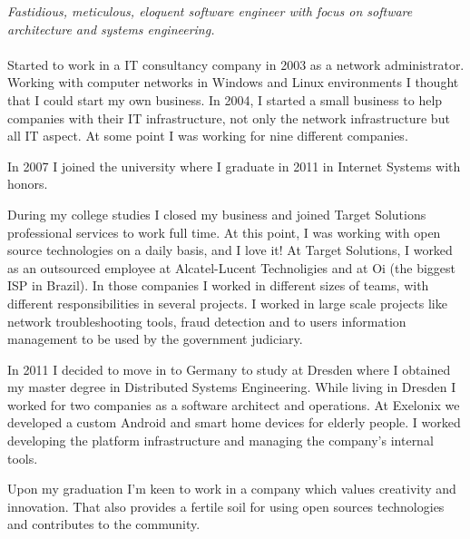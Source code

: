 \documentclass[10pt,a4paper]{article}
\newcommand*\acr[1]{\textscale{.85}{#1}}
\begin{document}
\vspace{-1.3em}  %
\begin{multicols}{2}  %
\noindent \emph{Fastidious, meticulous, eloquent software engineer with focus on software architecture and systems engineering.}
\\
\\
Started to work in a IT consultancy company in 2003 as a network administrator. Working with computer networks in Windows and Linux environments I thought that I could start my own business. In 2004, I started a small business to help companies with their IT infrastructure, not only the network infrastructure but all IT aspect. At some point I was working for nine different companies.

In 2007 I joined the \acr{CEFET/RJ} university where I graduate in 2011 in Internet Systems with honors.

During my college studies I closed my business and joined Target Solutions professional services to work full time. At this point, I was working with open source technologies on a daily basis, and I love it! At Target Solutions, I worked as an outsourced employee at Alcatel-Lucent Technoligies and at Oi (the biggest ISP in Brazil). In those companies I worked in different sizes of teams, with different responsibilities in several projects. I worked in large scale projects like network troubleshooting tools, fraud detection and to users information management to be used by the government judiciary.

In 2011 I decided to move in to Germany to study at \acr{TU} Dresden where I obtained my master degree in Distributed Systems Engineering. While living in Dresden I worked for two companies as a software architect and operations. At Exelonix we developed a custom Android and smart home devices for elderly people. I worked developing the platform infrastructure and managing the company's internal tools.


Upon my graduation I'm keen to work in a company which values creativity and innovation. That also provides a fertile soil for using open sources technologies and contributes to the community.

\end{multicols}
\end{document}
